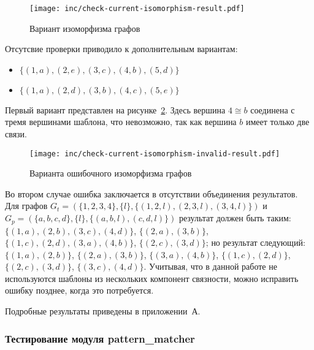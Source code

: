 \begin{figure}[!ht]
\centering
\texttt{[image: inc/check-current-isomorphism-result.pdf]}
\caption{Вариант изоморфизма графов}
\label{fig:check-current-isomorphism-result}
\end{figure}

Отсутсвие проверки приводило к дополнительным вариантам:
\begin{itemize}
\item $\{ (1, a), (2, e), (3, c), (4, b), (5, d) \}$
\item $\{ (1, a), (2, d), (3, b), (4, c), (5, e) \}$
\end{itemize}
Первый вариант представлен на
рисунке~\ref{fig:check-current-isomorphism-invalid-result}.
Здесь вершина $4 \cong b$ соединена с тремя вершинами шаблона,
что невозможно, так как вершина $b$ имеет только две связи.

\begin{figure}[!ht]
\centering
\texttt{[image: inc/check-current-isomorphism-invalid-result.pdf]}
\caption{Варианта ошибочного изоморфизма графов}
\label{fig:check-current-isomorphism-invalid-result}
\end{figure}

Во втором случае ошибка заключается в отсутствии объединения результатов.
Для графов $G_t = (\{ 1, 2, 3, 4 \}, \{ l \}, \{ (1, 2, l), (2, 3, l), (3, 4, l) \})$
и $G_p = (\{ a, b, c, d \}, \{ l \}, \{ (a, b, l), (c, d, l) \})$
результат должен быть таким:
$\{ (1, a), (2, b), (3, c), (4, d) \}$,
$\{ (2, a), (3, b) \}$,
$\{ (1, c), (2, d), (3, a), (4, b) \}$,
$\{ (2, c), (3, d) \}$;
но результат следующий:
$\{ (1, a), (2, b) \}$,
$\{ (2, a), (3, b) \}$,
$\{ (3, a), (4, b) \}$,
$\{ (1, c), (2, d) \}$,
$\{ (2, c), (3, d) \}$,
$\{ (3, c), (4, d) \}$.
Учитывая, что в данной работе не используются шаблоны из нескольких компонент
связности, можно исправить ошибку позднее, когда это потребуется.

Подробные результаты приведены в приложении~А.

\subsubsection{Тестирование модуля pattern\_matcher}

